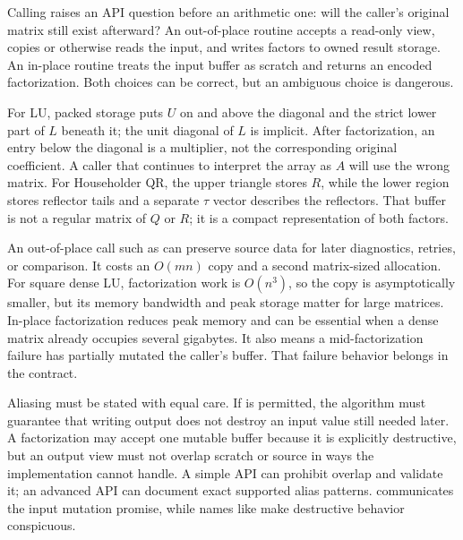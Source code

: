Calling  raises an API question before an arithmetic one: will the caller's original matrix still exist afterward? An out-of-place routine accepts a read-only view, copies or otherwise reads the input, and writes factors to owned result storage. An in-place routine treats the input buffer as scratch and returns an encoded factorization. Both choices can be correct, but an ambiguous choice is dangerous.

For LU, packed storage puts \(U\) on and above the diagonal and the strict lower part of \(L\) beneath it; the unit diagonal of \(L\) is implicit. After factorization, an entry below the diagonal is a multiplier, not the corresponding original coefficient. A caller that continues to interpret the array as \(A\) will use the wrong matrix. For Householder QR, the upper triangle stores \(R\), while the lower region stores reflector tails and a separate \(\tau\) vector describes the reflectors. That buffer is not a regular matrix of \(Q\) or \(R\); it is a compact representation of both factors.

An out-of-place call such as  can preserve source data for later diagnostics, retries, or comparison. It costs an \(O(mn)\) copy and a second matrix-sized allocation. For square dense LU, factorization work is \(O(n^3)\), so the copy is asymptotically smaller, but its memory bandwidth and peak storage matter for large matrices. In-place factorization reduces peak memory and can be essential when a dense matrix already occupies several gigabytes. It also means a mid-factorization failure has partially mutated the caller's buffer. That failure behavior belongs in the contract.

Aliasing must be stated with equal care. If  is permitted, the algorithm must guarantee that writing output does not destroy an input value still needed later. A factorization may accept one mutable buffer because it is explicitly destructive, but an output view must not overlap scratch or source in ways the implementation cannot handle. A simple API can prohibit overlap and validate it; an advanced API can document exact supported alias patterns.  communicates the input mutation promise, while names like  make destructive behavior conspicuous.

